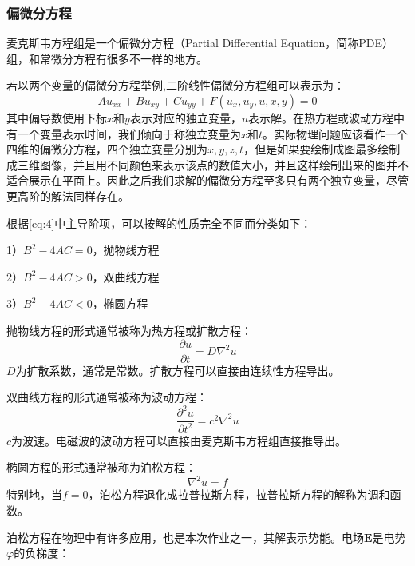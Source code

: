 \documentclass[UTF8,a4paper,10pt]{ctexart}
\begin{document}
\begin{multicols}{2}
            \subsubsection{偏微分方程}
            麦克斯韦方程组是一个偏微分方程（Partial Differential Equation，简称PDE）组，和常微分方程有很多不一样的地方。\par
            若以两个变量的偏微分方程举例,二阶线性偏微分方程组可以表示为：
            \begin{equation}\label{eq:4}
                    Au_{xx} + Bu_{xy} + Cu_{yy} + F(u_x,u_y,u,x,y) = 0
            \end{equation}
            其中偏导数使用下标$x$和$y$表示对应的独立变量，$u$表示解。在热方程或波动方程中有一个变量表示时间，我们倾向于称独立变量为$x$和$t$。实际物理问题应该看作一个四维的偏微分方程，四个独立变量分别为$x,y,z,t$，但是如果要绘制成图最多绘制成三维图像，并且用不同颜色来表示该点的数值大小，并且这样绘制出来的图并不适合展示在平面上。因此之后我们求解的偏微分方程至多只有两个独立变量，尽管更高阶的解法同样存在。\par
            根据\eqref{eq:4}中主导阶项，可以按解的性质完全不同而分类如下：\par
            1）$B^2 - 4AC = 0$，抛物线方程\par
            2）$B^2 - 4AC > 0$，双曲线方程\par
            3）$B^2 - 4AC < 0$，椭圆方程\par
            抛物线方程的形式通常被称为热方程或扩散方程：
            \begin{equation}
                \frac{\partial u}{\partial t} = D\nabla^2 u
            \end{equation}
            $D$为扩散系数，通常是常数。扩散方程可以直接由连续性方程导出。\par
            双曲线方程的形式通常被称为波动方程：
            \begin{equation}
                \frac{\partial^2u}{\partial t^2} = c^2\nabla^2 u
            \end{equation}
            $c$为波速。电磁波的波动方程可以直接由麦克斯韦方程组直接推导出。\par
            椭圆方程的形式通常被称为泊松方程：
            \begin{equation}
                \nabla^2 u = f
            \end{equation}
            特别地，当$f=0$，泊松方程退化成拉普拉斯方程，拉普拉斯方程的解称为调和函数。\par
            泊松方程在物理中有许多应用，也是本次作业之一，其解表示势能。电场$\bm{E}$是电势$\varphi$的负梯度：

\end{multicols}
\end{document}
